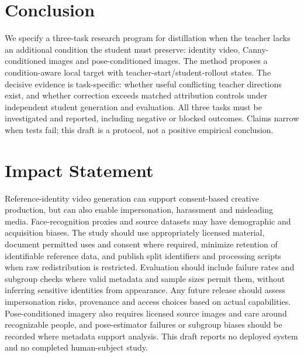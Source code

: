 \documentclass[11pt]{article}
\begin{document}
\section{Conclusion}
We specify a three-task research program for distillation when the teacher lacks an additional condition the student must preserve: identity video, Canny-conditioned images and pose-conditioned images. The method proposes a condition-aware local target with teacher-start/student-rollout states. The decisive evidence is task-specific: whether useful conflicting teacher directions exist, and whether correction exceeds matched attribution controls under independent student generation and evaluation. All three tasks must be investigated and reported, including negative or blocked outcomes. Claims narrow when tests fail; this draft is a protocol, not a positive empirical conclusion.

\section*{Impact Statement}
Reference-identity video generation can support consent-based creative production, but can also enable impersonation, harassment and misleading media. Face-recognition proxies and source datasets may have demographic and acquisition biases. The study should use appropriately licensed material, document permitted uses and consent where required, minimize retention of identifiable reference data, and publish split identifiers and processing scripts when raw redistribution is restricted. Evaluation should include failure rates and subgroup checks where valid metadata and sample sizes permit them, without inferring sensitive identities from appearance. Any future release should assess impersonation risks, provenance and access choices based on actual capabilities. Pose-conditioned imagery also requires licensed source images and care around recognizable people, and pose-estimator failures or subgroup biases should be recorded where metadata support analysis. This draft reports no deployed system and no completed human-subject study.
\end{document}

